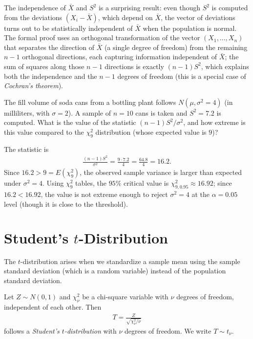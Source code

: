 \begin{observacion}
The independence of $\bar{X}$ and $S^2$ is a surprising result: even though $S^2$ is computed from the deviations $(X_i-\bar{X})$, which depend on $\bar{X}$, the vector of deviations turns out to be statistically independent of $\bar{X}$ when the population is normal. The formal proof uses an orthogonal transformation of the vector $(X_1,\ldots,X_n)$ that separates the direction of $\bar{X}$ (a single degree of freedom) from the remaining $n-1$ orthogonal directions, each capturing information independent of $\bar X$; the sum of squares along those $n-1$ directions is exactly $(n-1)S^2$, which explains both the independence and the $n-1$ degrees of freedom (this is a special case of \emph{Cochran's theorem}).
\end{observacion}

\begin{ejemplo}
 \label{exmp:5.3.1}
The fill volume of soda cans from a bottling plant follows $N(\mu, \sigma^2=4)$ (in milliliters, with $\sigma=2$). A sample of $n=10$ cans is taken and $S^2 = 7.2$ is computed. What is the value of the statistic $(n-1)S^2/\sigma^2$, and how extreme is this value compared to the $\chi^2_9$ distribution (whose expected value is $9$)?
\end{ejemplo}

\begin{solucion}
The statistic is
\begin{align}
 \frac{(n-1)S^2}{\sigma^2} = \frac{9 \cdot 7.2}{4} = \frac{64.8}{4} = 16.2.
\end{align}
Since $16.2 > 9 = E(\chi^2_9)$, the observed sample variance is larger than expected under $\sigma^2=4$. Using $\chi^2_9$ tables, the $95\%$ critical value is $\chi^2_{9,0.95} \approx 16.92$; since $16.2 < 16.92$, the value is not extreme enough to reject $\sigma^2=4$ at the $\alpha=0.05$ level (though it is close to the threshold).
\end{solucion}



\section{Student's $t$-Distribution}

The $t$-distribution arises when we standardize a sample mean using the sample standard deviation (which is a random variable) instead of the population standard deviation.

\begin{definicion}
Let $Z \sim N(0,1)$ and $\chi^2_\nu$ be a chi-square variable with $\nu$ degrees of freedom, independent of each other. Then
\begin{align}
 \label{eq:3.2.12}
 T = \frac{Z}{\sqrt{\chi^2_\nu / \nu}}
\end{align}
follows a \emph{Student's $t$-distribution} with $\nu$ degrees of freedom. We write $T \sim t_\nu$.
\end{definicion}

